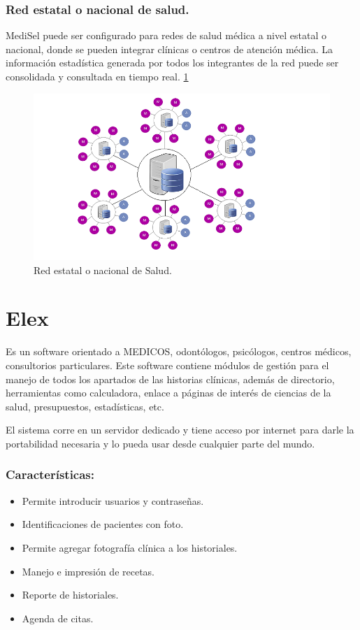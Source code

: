 \subsubsection{Red estatal o nacional de salud.}
MediSel puede ser configurado para redes de salud médica a nivel estatal o nacional, donde se pueden integrar clínicas o centros de atención médica. La información estadística generada por todos los integrantes de la red puede ser consolidada y consultada en tiempo real. \cite{esquemas} \ref{figura6}

\begin{figure}[h]
  \label{figura6}
  \centering
  \includegraphics[scale=.35]{lib/assets/6}
  \caption{Red estatal o nacional de Salud.}
\end{figure}



\section{Elex}
Es un software orientado a MEDICOS, odontólogos, psicólogos, centros médicos, consultorios particulares. Este software contiene módulos de gestión para el manejo de todos los apartados de las historias clínicas, además de directorio, herramientas como calculadora, enlace a páginas de interés de ciencias de la salud, presupuestos, estadísticas, etc.\cite{elex}

El sistema corre en un servidor dedicado y tiene acceso por internet para darle la portabilidad necesaria y lo pueda usar desde cualquier parte del mundo.
\subsubsection{Características:}
  \begin{itemize}
    \item Permite introducir usuarios y contraseñas.
    \item Identificaciones de pacientes con foto.
    \item Permite agregar fotografía clínica a los historiales.
    \item Manejo e impresión de recetas.
    \item Reporte de historiales.
    \item Agenda de citas.

  \end{itemize}


